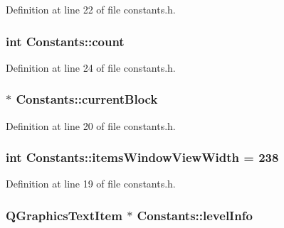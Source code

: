 Definition at line 22 of file constants.h.\hypertarget{class_constants_a1b683196215efa1070fa1a339ebfb1e7}{
\subsubsection[{count}]{\setlength{\rightskip}{0pt plus 5cm}int {\bf Constants::count}}}
\label{class_constants_a1b683196215efa1070fa1a339ebfb1e7}


Definition at line 24 of file constants.h.\hypertarget{class_constants_a156644d2eac78b49b57528021e6841e8}{
\subsubsection[{currentBlock}]{ $\ast$ {\bf Constants::currentBlock}}}
\label{class_constants_a156644d2eac78b49b57528021e6841e8}


Definition at line 20 of file constants.h.\hypertarget{class_constants_ac2f79d1f42a45d4e8bbb648de429d93a}{
\subsubsection[{itemsWindowViewWidth}]{\setlength{\rightskip}{0pt plus 5cm}int {\bf Constants::itemsWindowViewWidth} = 238}}
\label{class_constants_ac2f79d1f42a45d4e8bbb648de429d93a}


Definition at line 19 of file constants.h.\hypertarget{class_constants_a1690abb2f0185ca0c74b3cad7db6176e}{
\subsubsection[{levelInfo}]{\setlength{\rightskip}{0pt plus 5cm}QGraphicsTextItem $\ast$ {\bf Constants::levelInfo}}}
\label{class_constants_a1690abb2f0185ca0c74b3cad7db6176e}


